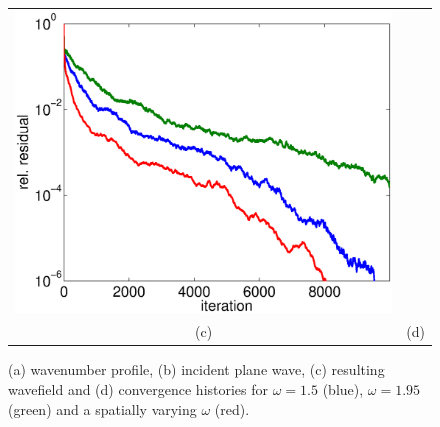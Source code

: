 \documentclass{article}
\begin{document}
\begin{figure}
\begin{tabular}{cc}
\includegraphics[scale=.3]{exp1_r}\\
{\small (c)}&{\small (d)}\\
\end{tabular}
\label{fig:exp2d}
\caption{(a) wavenumber profile, (b) incident plane wave, (c) resulting wavefield and (d) convergence histories for
$\omega = 1.5$ (blue), $\omega=1.95$ (green) and a spatially varying $\omega$ (red).}
\end{figure}
\end{document}
